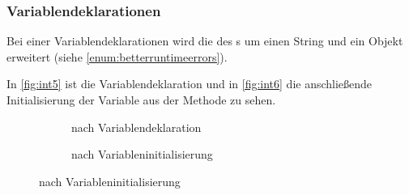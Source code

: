 {    %
    \subsubsection{Variablendeklarationen}
    \label{sssec:Variablendeklarationen}
      Bei einer Variablendeklarationen wird die  des s um einen String und ein  Objekt erweitert (siehe \autoref{enum:betterruntimeerrors}).

      In \autoref{fig:int5} ist die Variablendeklaration und in \autoref{fig:int6} die anschließende Initialisierung der Variable aus der  Methode zu sehen.
      \begin{figure}[H]
        \vspace*{-\baselineskip}
        \centering
        \begin{minipage}{.45\linewidth}
          \begin{figure}[H]
            \centering
            \caption{ nach Variablendeklaration}
            \label{fig:int5}
          \end{figure}
        \end{minipage}%
        \begin{minipage}{.45\linewidth}
          \begin{figure}[H]
            \centering
            \caption{ nach Variableninitialisierung}
            \label{fig:int6}
          \end{figure}
        \end{minipage}
      \end{figure}

}
